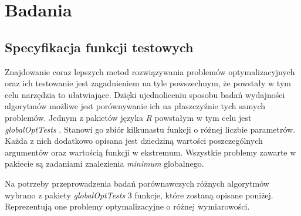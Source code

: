 \newpage
\chapter{Badania}


\section{Specyfikacja funkcji testowych}
Znajdowanie coraz lepszych metod rozwiązywania problemów optymalizacyjnych oraz ich testowanie jest zagadnieniem na tyle powszechnym, że powstały w tym celu narzędzia to ułatwiające. Dzięki ujednoliceniu sposobu badań wydajności algorytmów możliwe jest porównywanie ich na płaszczyźnie tych samych problemów. Jednym z pakietów języka \emph{R} powstałym w tym celu jest \emph{globalOptTests} \cite{globalOptTestsPackage}. Stanowi go zbiór kilkunastu funkcji o różnej liczbie parametrów. Każda z nich dodatkowo opisana jest dziedziną wartości poszczególnych argumentów oraz wartością funkcji w ekstremum. Wszystkie problemy zawarte w pakiecie są zadaniami znalezienia \emph{minimum} globalnego.
\par
Na potrzeby przeprowadzenia badań porównawczych różnych algorytmów wybrano z pakiety \emph{globalOptTests} 3 funkcje, które zostaną opisane poniżej. Reprezentują one problemy  optymalizacyjne o różnej wymiarowości. 
